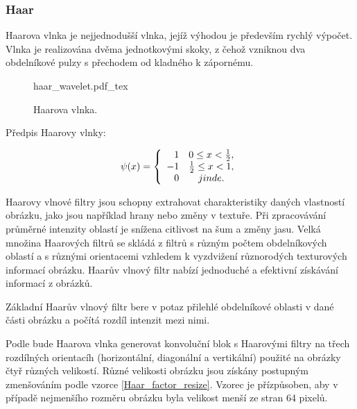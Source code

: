 \documentclass[czech,BP]{thesiskiv}
\begin{document}
\subsubsection{Haar}
\par Haarova vlnka je nejjednodušší vlnka, jejíž výhodou je především rychlý výpočet. Vlnka je realizována dvěma jednotkovými skoky, z čehož vzniknou dva obdelníkové pulzy s přechodem od kladného k zápornému. 

\begin{figure}[H]
    \centering
    \def\svgwidth{200px}
    {haar_wavelet.pdf_tex} 
    \caption{Haarova vlnka.}
\end{figure} 

Předpis Haarovy vlnky:

\begin{displaymath} 
	\label{haar} 
		    \psi(x) = \left\{ \begin{array}{r@{\quad}c}
    		1 & 0 \leq x < \frac{1}{2}, \\
    		-1 & \frac{1}{2} \leq x < 1, \\ 
    		0 & jinde. \\  \end{array} \right. 
\end{displaymath} 
\vspace{1cm}


\par Haarovy vlnové filtry jsou schopny extrahovat charakteristiky daných vlastností obrázku, jako jsou například hrany nebo změny v textuře.  Při zpracovávání průměrné intenzity oblastí je snížena citlivost na šum a změny jasu. Velká množina Haarových filtrů se skládá z filtrů s různým počtem obdelníkových oblastí a s různými orientacemi vzhledem k vyzdvižení různorodých texturových informací obrázku. Haarův vlnový filtr nabízí jednoduché a efektivní získávání informací z obrázků.
\par Základní Haarův vlnový filtr bere v potaz přilehlé obdelníkové oblasti v dané části obrázku a počítá rozdíl intenzit mezi nimi. 
 
\par Podle \citep{JEC} bude Haarova vlnka generovat konvoluční blok s Haarovými filtry na třech rozdílných orientacíh (horizontální, diagonální a vertikální) použité na obrázky čtyř různých velikostí. Různé velikosti obrázku jsou získány postupným zmenšováním podle vzorce \ref{Haar_factor_resize}. Vzorec je přízpůsoben, aby v případě nejmenšího rozměru obrázku byla velikost menší ze stran 64 pixelů. 
\end{document}
